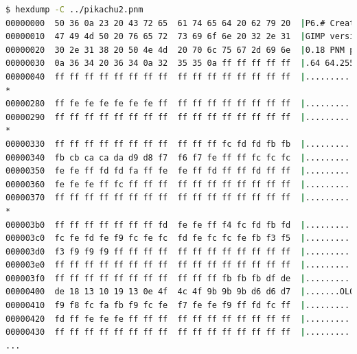 \begin{frame}
\begin{lstlisting}[language=bash, label=lst-pnm-raw, caption={Arquivo PNM RAW. Visualização com \texttt{hexdump}.}, postbreak=\mbox{$\hookrightarrow$\space}, basicstyle=\fontsize{6}{8}\selectfont\ttfamily]
$ hexdump -C ../pikachu2.pnm 
00000000  50 36 0a 23 20 43 72 65  61 74 65 64 20 62 79 20  |P6.# Created by |
00000010  47 49 4d 50 20 76 65 72  73 69 6f 6e 20 32 2e 31  |GIMP version 2.1|
00000020  30 2e 31 38 20 50 4e 4d  20 70 6c 75 67 2d 69 6e  |0.18 PNM plug-in|
00000030  0a 36 34 20 36 34 0a 32  35 35 0a ff ff ff ff ff  |.64 64.255......|
00000040  ff ff ff ff ff ff ff ff  ff ff ff ff ff ff ff ff  |................|
*
00000280  ff fe fe fe fe fe fe ff  ff ff ff ff ff ff ff ff  |................|
00000290  ff ff ff ff ff ff ff ff  ff ff ff ff ff ff ff ff  |................|
*
00000330  ff ff ff ff ff ff ff ff  ff ff ff fc fd fd fb fb  |................|
00000340  fb cb ca ca da d9 d8 f7  f6 f7 fe ff ff fc fc fc  |................|
00000350  fe fe ff fd fd fa ff fe  fe ff fd ff ff fd ff ff  |................|
00000360  fe fe fe ff fc ff ff ff  ff ff ff ff ff ff ff ff  |................|
00000370  ff ff ff ff ff ff ff ff  ff ff ff ff ff ff ff ff  |................|
*
000003b0  ff ff ff ff ff ff ff fd  fe fe ff f4 fc fd fb fd  |................|
000003c0  fc fe fd fe f9 fc fe fc  fd fe fc fc fe fb f3 f5  |................|
000003d0  f3 f9 f9 f9 ff ff ff ff  ff ff ff ff ff ff ff ff  |................|
000003e0  ff ff ff ff ff ff ff ff  ff ff ff ff ff ff ff ff  |................|
000003f0  ff ff ff ff ff ff ff ff  ff ff ff fb fb fb df de  |................|
00000400  de 18 13 10 19 13 0e 4f  4c 4f 9b 9b 9b d6 d6 d7  |.......OLO......|
00000410  f9 f8 fc fa fb f9 fc fe  f7 fe fe f9 ff fd fc ff  |................|
00000420  fd ff fe fe fe ff ff ff  ff ff ff ff ff ff ff ff  |................|
00000430  ff ff ff ff ff ff ff ff  ff ff ff ff ff ff ff ff  |................|
...
\end{lstlisting}

\end{frame}


